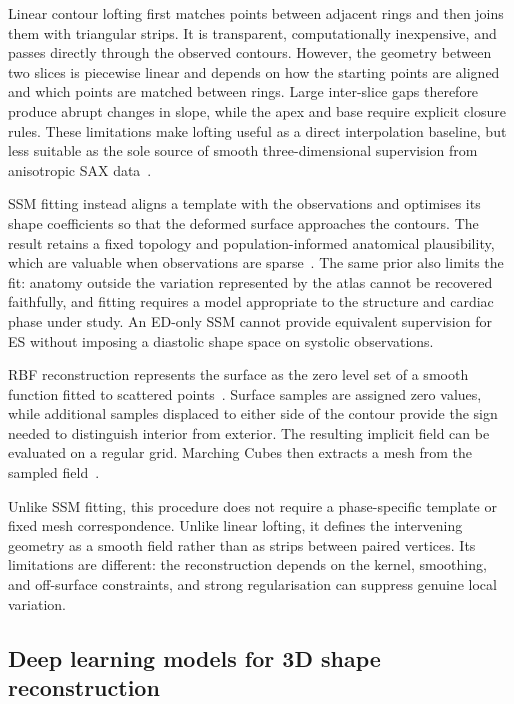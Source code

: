 Linear contour lofting first matches points between adjacent rings and then
joins them with triangular strips. It is
transparent, computationally inexpensive, and passes directly through the
observed contours. However, the geometry between two slices is piecewise linear
and depends on how the starting points are aligned and which points are matched
between rings.
Large inter-slice gaps therefore produce abrupt changes in slope, while the apex
and base require explicit closure rules. These limitations make lofting useful
as a direct interpolation baseline, but less suitable as the sole source of
smooth three-dimensional supervision from anisotropic SAX data~\parencite{petitjean2011segmentationreview}.

SSM fitting instead aligns a template with the observations and optimises its
shape coefficients so that the deformed surface approaches the contours. The
result retains a fixed topology and population-informed anatomical plausibility,
which are valuable when observations are sparse~\parencite{cootes1995asm,heimann2009ssmreview}. The same prior also limits the
fit: anatomy outside the variation represented by the atlas cannot be recovered
faithfully, and fitting requires a model appropriate to the structure and
cardiac phase under study. An ED-only SSM cannot provide equivalent supervision
for ES without imposing a diastolic shape space on systolic observations.

RBF reconstruction represents the surface as the zero level set of a smooth
function fitted to scattered points~\parencite{carr2001rbf}. Surface samples are
assigned zero values, while additional samples displaced to either side of the
contour provide the sign needed to distinguish interior from exterior. The
resulting implicit field can be evaluated on a regular grid. Marching Cubes then
extracts a mesh from the sampled field~\parencite{lorensen1987marchingcubes}.

Unlike SSM fitting, this
procedure does not require a phase-specific template or fixed mesh
correspondence. Unlike linear lofting, it defines the intervening geometry as a
smooth field rather than as strips between paired vertices. Its limitations are
different: the reconstruction depends on the kernel, smoothing, and off-surface
constraints, and strong regularisation can suppress genuine local variation.

\subsection{Deep learning models for 3D shape reconstruction}
\label{subsec:dl-reconstruction-review}

